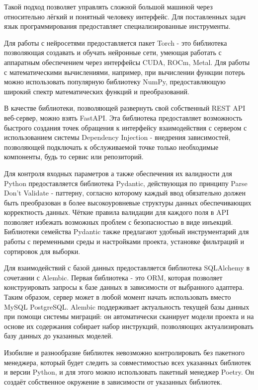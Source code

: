\documentclass[14pt]{extarticle}
\begin{document}
Такой подход позволяет управлять сложной большой машиной через относительно лёгкий и понятный человеку
интерфейс. Для поставленных задач язык программирования предоставляет специализированные инструменты. 

Для работы с нейросетями предоставляется пакет Torch - это библиотека позволяющая создавать и обучать нейронные
сети, умеющая работать с аппаратным обеспечением через интерфейсы CUDA, ROCm, Metal. Для работы с математическими
вычислениями, например, при вычислении функции потерь можно использовать популярную библиотеку NumPy, предоставляющую
широкий спектр математических функций и преобразований.

В качестве библиотеки, позволяющей развернуть свой собственный REST API веб-сервер, можно взять FastAPI. Эта библиотека
предоставляет возможность быстрого создания точек обращения к интерфейсу взаимодействия с сервером с использованием
системы Dependency Injection - внедрения зависимостей, позволяющей подключать к обслуживаемой точке только необходимые
компоненты, будь то сервис или репозиторий.

Для контроля входных параметров а также обеспечения их валидности для Python предоставляется библиотека Pydantic, 
действующая по принципу Parse Don't Validate - паттерну, согласно которому каждый ввод обязательно должен быть преобразован в 
более высокоуровневые структуры данных обеспечивающих корректность данных. 
Чёткие правила валидации для каждого поля в API позволяет избежать возможных проблем с безопасностью в виде
инъекций. Библиотеки семейства Pydantic также предлагают удобный инструментарий для работы с переменными среды и настройками
проекта, установке фильтраций и сортировок для выборки.

Для взаимодействий с базой данных предоставляется библиотека SQLAlchemy в сочетании с Alembic. Первая библиотека - 
это ORM, которая позволяет конструировать запросы к базе данных в зависимости от выбранного адаптера. Таким образом, 
сервер может в любой момент начать использовать вместо MySQL PostgreSQL. Alembic поддерживает актуальность текущей базы
данных при помощи системы миграций: он автоматически сканирует модели проекта и на основе их содержания собирает набор
инструкций, позволяющих актуализировать базу данных до указанных моделей.

Изобилие и разнообразие библиотек невозможно контролировать без пакетного менеджера, который будет следить за совместимостью
всех указанных библиотек и версии Python, и для этого можно использовать пакетный менеджер Poetry. Он создаёт собственное окружение
в зависимости от указанных библиотек.
\end{document}
